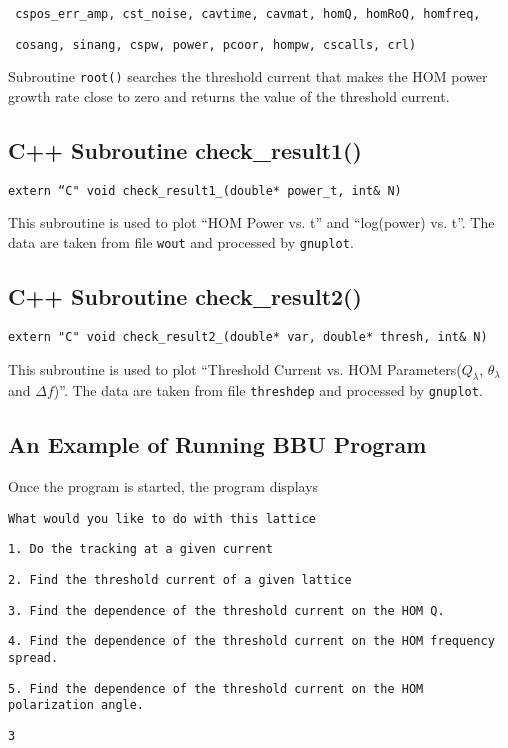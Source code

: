 \documentclass[12pt]{article}
\begin{document}
\texttt{     cspos\_err\_amp, cst\_noise, cavtime, cavmat, homQ, homRoQ, homfreq,}

\texttt{     cosang, sinang, cspw, power, pcoor, hompw, cscalls, crl)}

Subroutine \texttt{root()} searches the threshold current that makes the 
HOM power growth rate close to zero and returns the value of the
threshold current.

\subsection{C++ Subroutine check\_result1()}

\texttt{extern ``C" void check\_result1\_(double* power\_t, int\& N)}

This subroutine is used to plot ``HOM Power vs. t'' and ``log(power) vs. t''.
The data are taken from file \texttt{wout} and processed by \texttt{gnuplot}.

\subsection{C++ Subroutine check\_result2()}

\texttt{extern "C" void check\_result2\_(double* var, double* thresh, int\& N)}

This subroutine is used to plot ``Threshold Current vs. HOM Parameters($Q_\lambda$, $\theta_\lambda$ and $\Delta f$)''. The data are taken from file \texttt{threshdep} and processed by \texttt{gnuplot}.

\subsection{An Example of Running BBU Program}

Once the program is started, the program displays

\texttt{What would you like to do with this lattice}

\texttt{1. Do the tracking at a given current}

\texttt{2. Find the threshold current of a given lattice}

\texttt{3. Find the dependence of the threshold current on the HOM Q.}

\texttt{4. Find the dependence of the threshold current on the HOM frequency spread.}

\texttt{5. Find the dependence of the threshold current on the HOM polarization angle.}

\texttt{3}
\end{document}
